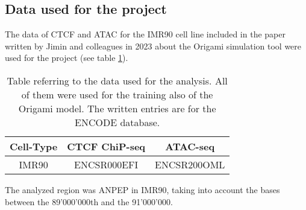 \subsection{Data used for the project} \label{methods: data used}
The data of CTCF and ATAC for the IMR90 cell line included in the paper written by Jimin and colleagues in 2023 about the Origami simulation tool
\cite{tanCelltypespecificPrediction3D2023}
were used for the project (see table \ref{tab:data}).

\begin{table}[H]
    \centering
    \begin{tabular}{|c|c|c|}
        \hline
        \textbf{Cell-Type} & \textbf{CTCF ChiP-seq} & \textbf{ATAC-seq}\\
        \hline
        IMR90 & ENCSR000EFI & ENCSR200OML\\
        \hline
    \end{tabular}
    \caption{Table referring to the data used for the analysis. All of them were used for the training also of the Origami\cite{tanCelltypespecificPrediction3D2023} model. The written entries are for the ENCODE database\cite{encodeprojectconsortiumIntegratedEncyclopediaDNA2012}.}
    \label{tab:data}
\end{table}

The analyzed region was ANPEP in IMR90, taking into account the bases between the 89'000'000th and the 91'000'000. 